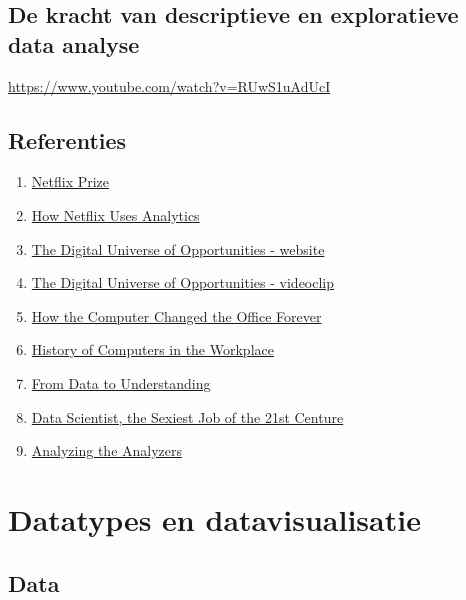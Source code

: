 \documentclass[]{memoir}
\providecommand{\tightlist}{%
  \setlength{\itemsep}{0pt}\setlength{\parskip}{0pt}}
\begin{document}
\section{De kracht van descriptieve en exploratieve data
analyse}\label{de-kracht-van-descriptieve-en-exploratieve-data-analyse}

\url{https://www.youtube.com/watch?v=RUwS1uAdUcI}

\section{Referenties}\label{referenties}

\begin{enumerate}
\def\labelenumi{\arabic{enumi}.}
\tightlist
\item
  \href{https://en.wikipedia.org/wiki/Netflix_Prize}{Netflix Prize}
\item
  \href{https://blog.kissmetrics.com/how-netflix-uses-analytics/}{How
  Netflix Uses Analytics}
\item
  \href{https://www.emc.com/leadership/digital-universe/2014iview/index.htm}{The
  Digital Universe of Opportunities - website}
\item
  \href{http://bcove.me/9s38pkjm}{The Digital Universe of Opportunities
  - videoclip}
\item
  \href{http://www.bbc.com/news/magazine-23509153}{How the Computer
  Changed the Office Forever}
\item
  \href{http://www.ehow.com/about_6362639_history-computers-workplace.html}{History
  of Computers in the Workplace}
\item
  \href{https://en.wikipedia.org/wiki/File:DIKW_(1).png}{From Data to
  Understanding}
\item
  \href{https://hbr.org/2012/10/data-scientist-the-sexiest-job-of-the-21st-century}{Data
  Scientist, the Sexiest Job of the 21st Centure}
\item
  \href{http://www.oreilly.com/data/free/files/analyzing-the-analyzers.pdf}{Analyzing
  the Analyzers}
\end{enumerate}

\chapter{Datatypes en
datavisualisatie}\label{datatypes-en-datavisualisatie}

\section{Data}\label{data}
\end{document}
